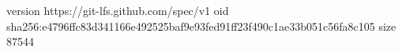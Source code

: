 version https://git-lfs.github.com/spec/v1
oid sha256:e4796ffc83d341166e492525baf9e93fed91ff23f490c1ae33b051c56fa8c105
size 87544
